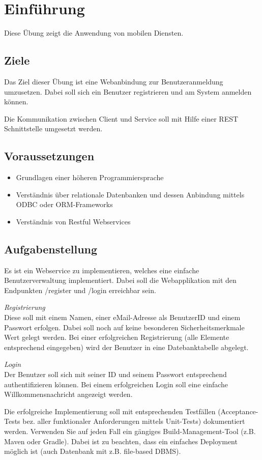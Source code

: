 
\section{Einführung}
Diese Übung zeigt die Anwendung von mobilen Diensten.

\subsection{Ziele}
Das Ziel dieser Übung ist eine Webanbindung zur Benutzeranmeldung umzusetzen. Dabei soll sich ein Benutzer registrieren und am System anmelden können.

Die Kommunikation zwischen Client und Service soll mit Hilfe einer REST Schnittstelle umgesetzt werden.

\subsection{Voraussetzungen}
\begin{itemize}
	\item Grundlagen einer höheren Programmiersprache
	\item Verständnis über relationale Datenbanken und dessen Anbindung mittels ODBC oder ORM-Frameworks
	\item Verständnis von Restful Webservices
\end{itemize}


\subsection{Aufgabenstellung}
Es ist ein Webservice zu implementieren, welches eine einfache Benutzerverwaltung implementiert. Dabei soll die Webapplikation mit den Endpunkten /register und /login erreichbar sein.

\textit{Registrierung}\\
Diese soll mit einem Namen, einer eMail-Adresse als BenutzerID und einem Passwort erfolgen. Dabei soll noch auf keine besonderen Sicherheitsmerkmale Wert gelegt werden. Bei einer erfolgreichen Registrierung (alle Elemente entsprechend eingegeben) wird der Benutzer in eine Datebanktabelle abgelegt.

\textit{Login}\\
Der Benutzer soll sich mit seiner ID und seinem Passwort entsprechend authentifizieren können. Bei einem erfolgreichen Login soll eine einfache Willkommensnachricht angezeigt werden.

Die erfolgreiche Implementierung soll mit entsprechenden Testfällen (Acceptance-Tests bez. aller funktionaler Anforderungen mittels Unit-Tests) dokumentiert werden. Verwenden Sie auf jeden Fall ein gängiges Build-Management-Tool (z.B. Maven oder Gradle). Dabei ist zu beachten, dass ein einfaches Deployment möglich ist (auch Datenbank mit z.B. file-based DBMS).
\clearpage

